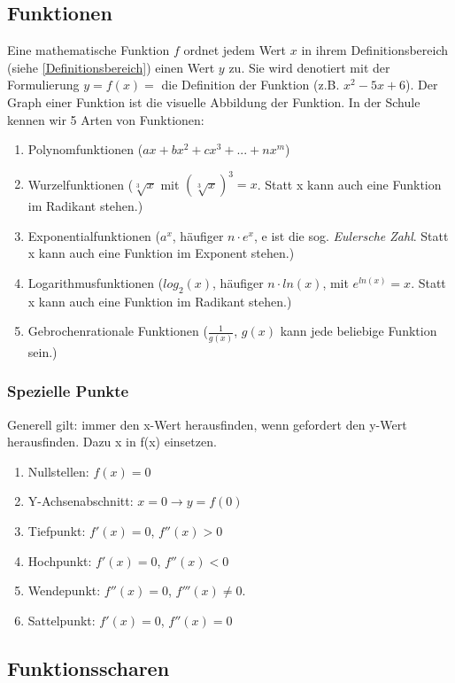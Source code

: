 \documentclass{article}
\begin{document}
\subsection{Funktionen}
Eine mathematische Funktion $f$ ordnet jedem Wert $x$ in ihrem Definitionsbereich (siehe \ref{Definitionsbereich})
einen Wert $y$ zu. Sie wird denotiert mit der Formulierung $y=f(x)= $ die Definition der Funktion (z.B. $x^2-5x+6$).
Der Graph einer Funktion ist die visuelle Abbildung der Funktion. In der Schule kennen wir 5 Arten von Funktionen:
\begin{enumerate}
    \item Polynomfunktionen ($ax+bx^2+cx^3+...+nx^m$)
    \item Wurzelfunktionen ($ \sqrt[3]{x} $ mit $ (\sqrt[3]{x})^3=x $. Statt x kann auch eine Funktion im Radikant stehen.)
    \item Exponentialfunktionen ($a^{x}$, häufiger $n \cdot e^x$, e ist die sog. \emph{Eulersche Zahl}. Statt x kann auch eine Funktion im Exponent stehen.)
    \item Logarithmusfunktionen ($log_2(x)$, häufiger $n \cdot ln(x)$, mit $e^{ln(x)}=x$. Statt x kann auch eine Funktion im Radikant stehen.)
    \item Gebrochenrationale Funktionen ($\frac{1}{g(x)}$, $g(x)$ kann jede beliebige Funktion sein.)

\end{enumerate}

\subsubsection{Spezielle Punkte}\label{Spezielle Punkte}

Generell gilt: immer den x-Wert herausfinden, wenn gefordert den y-Wert herausfinden. Dazu x in f(x) einsetzen.

\begin{enumerate}
    \item Nullstellen: $f(x)=0$
    \item Y-Achsenabschnitt: $x=0 \rightarrow y=f(0)$
    \item Tiefpunkt: $f'(x)=0$, $f''(x)>0$
    \item Hochpunkt: $f'(x)=0$, $f''(x)<0$
    \item Wendepunkt: $f''(x)=0$, $f'''(x)\neq 0$.
    \item Sattelpunkt: $f'(x)=0$, $f''(x)=0$
\end{enumerate}

\subsection{Funktionsscharen}
\end{document}
